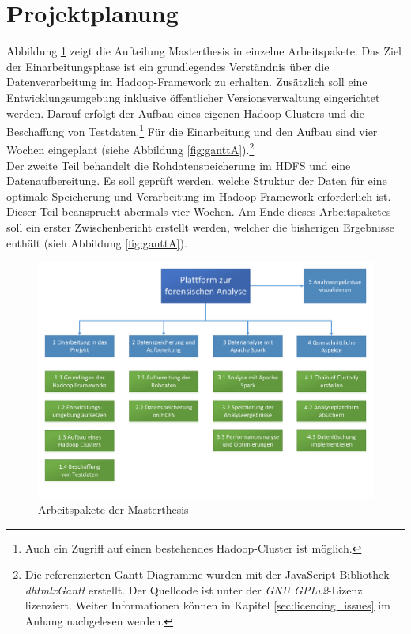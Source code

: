 \section{Projektplanung}
\label{sec:project_plan}
Abbildung \ref{fig:workpackages} zeigt die Aufteilung Masterthesis in einzelne Arbeitspakete. Das Ziel der Einarbeitungsphase ist ein grundlegendes Verständnis über die Datenverarbeitung im Hadoop-Framework zu erhalten. Zusätzlich soll eine Entwicklungsumgebung inklusive öffentlicher Versionsverwaltung eingerichtet werden. Darauf erfolgt der Aufbau eines eigenen Hadoop-Clusters und die Beschaffung von Testdaten.\footnote{Auch ein Zugriff auf einen bestehendes Hadoop-Cluster ist möglich.} Für die Einarbeitung und den Aufbau sind vier Wochen eingeplant (siehe Abbildung \ref{fig:ganttA}).\footnote{Die referenzierten Gantt-Diagramme wurden mit der JavaScript-Bibliothek \textit{dhtmlxGantt} erstellt. Der Quellcode ist unter der \textit{GNU GPLv2}-Lizenz lizenziert. Weiter Informationen können in Kapitel \ref{sec:licencing_issues} im Anhang nachgelesen werden.}\\

\noindent
Der zweite Teil behandelt die Rohdatenspeicherung im HDFS und eine Datenaufbereitung. Es soll geprüft werden, welche Struktur der Daten für eine optimale Speicherung und Verarbeitung im Hadoop-Framework erforderlich ist. Dieser Teil beansprucht abermals vier Wochen. Am Ende dieses Arbeitspaketes soll ein erster Zwischenbericht erstellt werden, welcher die bisherigen Ergebnisse enthält (sieh Abbildung \ref{fig:ganttA}).\\

\begin{figure}[ht]
  \centering
  \includegraphics[width=\textwidth]{./resource/Arbeitspakete.pdf}
  \caption{Arbeitspakete der Masterthesis}
  \label{fig:workpackages}
\end{figure}

